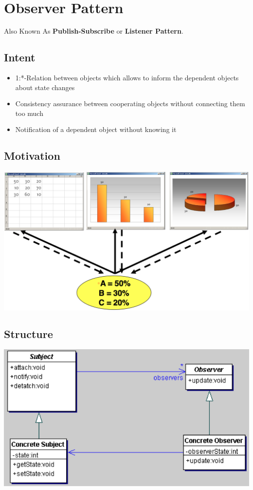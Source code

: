 \documentclass[a4paper, 11pt]{article}
\begin{document}
\newpage
\section{Observer Pattern}
Also Known As \textbf{Publish-Subscribe} or \textbf{Listener Pattern}.

\subsection{Intent}
\begin{itemize}
	\item 1:*-Relation between objects which allows to inform the dependent objects about state changes
	\item Consistency assurance between cooperating objects without connecting them too much
	\item Notification of a dependent object without knowing it
\end{itemize}

\subsection{Motivation}
\begin{center}
	\includegraphics[scale=0.4]{observer-motivation.png}
\end{center}

\subsection{Structure}
\begin{center}
	\includegraphics[scale=0.5]{observer-structure.png}
\end{center}
\end{document}
